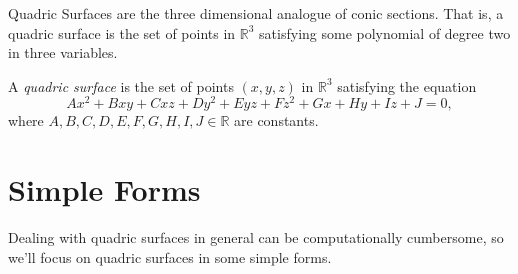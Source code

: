 \documentclass{ximera}
\begin{document}
Quadric Surfaces are the three dimensional analogue of conic sections. That is, a quadric surface is the set of points in $\mathbb{R}^3$ satisfying some polynomial of degree two in three variables.

\begin{definition}
A \emph{quadric surface} is the set of points $(x,y,z)$ in $\mathbb{R}^3$ satisfying the equation
\[
Ax^2 + Bxy + Cxz + Dy^2 + Eyz + Fz^2 +Gx + Hy + Iz + J = 0,
\]
where $A,B,C,D,E,F,G,H,I,J\in\mathbb{R}$ are constants.
\end{definition}

\section*{Simple Forms}

Dealing with quadric surfaces in general can be computationally cumbersome, so we'll focus on quadric surfaces in some simple forms.
\end{document}

